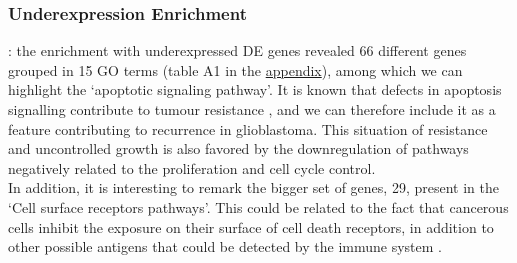 \documentclass[9pt,twocolumn,twoside]{gsajnl}
\begin{document}
\subsubsection*{Underexpression Enrichment}: the enrichment with underexpressed DE genes revealed 66 different genes grouped in 15 GO terms (table A1 in the \href{http://ieoproject.tk/ieo/appendix.pdf}{appendix}), among which we can highlight the `apoptotic signaling pathway'. It is known that defects in apoptosis signalling contribute to tumour resistance \citep{Debatin2004}, and we can therefore include it as a feature contributing to recurrence in glioblastoma. This situation of resistance and uncontrolled growth is also favored by the downregulation of pathways negatively related to the proliferation and cell cycle control.\\
In addition, it is interesting to remark the bigger set of genes, 29, present in the `Cell surface receptors pathways'. This could be related to the fact that cancerous cells inhibit the exposure on their surface of cell death receptors, in addition to other possible antigens that could be detected by the immune system \citep{Ozoren2003}.
\end{document}
